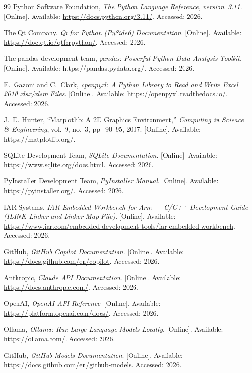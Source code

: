 \documentclass[12pt,a4paper,oneside]{book}
\begin{document}
\begin{thebibliography}{99}
Python Software Foundation, \emph{The Python Language Reference, version~3.11}. [Online]. Available: \url{https://docs.python.org/3.11/}. Accessed: 2026.

The Qt Company, \emph{Qt for Python (PySide6) Documentation}. [Online]. Available: \url{https://doc.qt.io/qtforpython/}. Accessed: 2026.

The pandas development team, \emph{pandas: Powerful Python Data Analysis Toolkit}. [Online]. Available: \url{https://pandas.pydata.org/}. Accessed: 2026.

E.~Gazoni and C.~Clark, \emph{openpyxl: A Python Library to Read and Write Excel 2010 xlsx/xlsm Files}. [Online]. Available: \url{https://openpyxl.readthedocs.io/}. Accessed: 2026.

J.~D. Hunter, ``Matplotlib: A 2D Graphics Environment,'' \emph{Computing in Science \& Engineering}, vol.~9, no.~3, pp.~90--95, 2007. [Online]. Available: \url{https://matplotlib.org/}.

SQLite Development Team, \emph{SQLite Documentation}. [Online]. Available: \url{https://www.sqlite.org/docs.html}. Accessed: 2026.

PyInstaller Development Team, \emph{PyInstaller Manual}. [Online]. Available: \url{https://pyinstaller.org/}. Accessed: 2026.

IAR Systems, \emph{IAR Embedded Workbench for Arm --- C/C++ Development Guide (ILINK Linker and Linker Map File)}. [Online]. Available: \url{https://www.iar.com/embedded-development-tools/iar-embedded-workbench}. Accessed: 2026.

GitHub, \emph{GitHub Copilot Documentation}. [Online]. Available: \url{https://docs.github.com/en/copilot}. Accessed: 2026.

Anthropic, \emph{Claude API Documentation}. [Online]. Available: \url{https://docs.anthropic.com/}. Accessed: 2026.

OpenAI, \emph{OpenAI API Reference}. [Online]. Available: \url{https://platform.openai.com/docs/}. Accessed: 2026.

Ollama, \emph{Ollama: Run Large Language Models Locally}. [Online]. Available: \url{https://ollama.com/}. Accessed: 2026.

GitHub, \emph{GitHub Models Documentation}. [Online]. Available: \url{https://docs.github.com/en/github-models}. Accessed: 2026.


\end{thebibliography}
\end{document}
